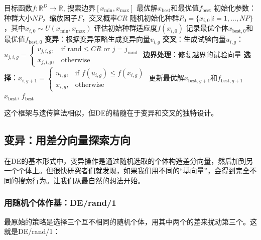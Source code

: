 \documentclass[lang=cn,zihao=-4,a4paper,fontset=windows]{beautybook}
\begin{document}
\begin{algorithm}[H]
\caption{标准差分进化算法}
\begin{algorithmic}[1]
\REQUIRE 目标函数$f: \mathbb{R}^D \rightarrow \mathbb{R}$, 搜索边界$[x_{\min}, x_{\max}]$
\ENSURE 最优解$x_{\text{best}}$和最优值$f_{\text{best}}$
\STATE 初始化参数：种群大小$NP$，缩放因子$F$，交叉概率$CR$
\STATE 随机初始化种群$P_0 = \{x_{i,0} | i=1,\dots,NP\}$，其中$x_{i,0} \sim U(x_{\min}, x_{\max})$
\STATE 评估初始种群适应度$f(x_{i,0})$
\STATE 记录最优个体$x_{\text{best},0}$和最优值$f_{\text{best},0}$
        \STATE \textbf{变异}：根据变异策略生成变异向量$v_{i,g}$
        \STATE \textbf{交叉}：生成试验向量$u_{i,g}$：$u_{j,i,g} = 
        \begin{cases}
        v_{j,i,g}, & \text{if } \text{rand} \leq CR \text{ or } j = j_{\text{rand}} \\
        x_{j,i,g}, & \text{otherwise}
        \end{cases}$
        \STATE \textbf{边界处理}：修复越界的试验向量
        \STATE \textbf{选择}：$x_{i,g+1} = 
        \begin{cases}
        u_{i,g}, & \text{if } f(u_{i,g}) \leq f(x_{i,g}) \\
        x_{i,g}, & \text{otherwise}
        \end{cases}$
    \ENDFOR
    \STATE 更新最优解$x_{\text{best},g+1}$和$f_{\text{best},g+1}$
\ENDFOR
\RETURN $x_{\text{best}}$, $f_{\text{best}}$
\end{algorithmic}
\end{algorithm}

这个框架与遗传算法相似，但DE的精髓在于变异和交叉的独特设计。

\subsection{变异：用差分向量探索方向}

在DE的基本形式中，变异操作是通过随机选取的个体构造差分向量，然后加到另一个个体上。但很快研究者们就发现，如果我们用不同的“基向量”，会得到完全不同的搜索行为。让我们从最自然的想法开始。

\subsubsection{用随机个体作基：DE/rand/1}

最原始的策略是选择三个互不相同的随机个体，用其中两个的差来扰动第三个。这就是DE/rand/1：
\end{document}
